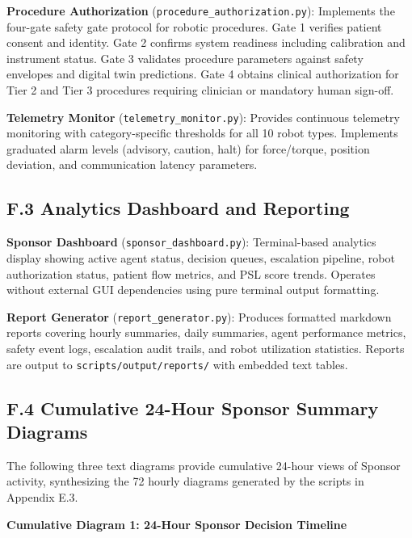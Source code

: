 \textbf{Procedure Authorization} (\texttt{procedure\_authorization.py}):
Implements the four-gate safety gate protocol for robotic procedures.
Gate 1 verifies patient consent and identity. Gate 2 confirms system
readiness including calibration and instrument status. Gate 3 validates
procedure parameters against safety envelopes and digital twin
predictions. Gate 4 obtains clinical authorization for Tier 2 and
Tier 3 procedures requiring clinician or mandatory human sign-off.

\textbf{Telemetry Monitor} (\texttt{telemetry\_monitor.py}):
Provides continuous telemetry monitoring with category-specific
thresholds for all 10 robot types. Implements graduated alarm levels
(advisory, caution, halt) for force/torque, position deviation, and
communication latency parameters.

\subsection*{F.3 Analytics Dashboard and Reporting}

\textbf{Sponsor Dashboard} (\texttt{sponsor\_dashboard.py}): Terminal-based
analytics display showing active agent status, decision queues, escalation
pipeline, robot authorization status, patient flow metrics, and PSL score
trends. Operates without external GUI dependencies using pure terminal
output formatting.

\textbf{Report Generator} (\texttt{report\_generator.py}): Produces
formatted markdown reports covering hourly summaries, daily summaries,
agent performance metrics, safety event logs, escalation audit trails,
and robot utilization statistics. Reports are output to
\texttt{scripts/output/reports/} with embedded text tables.

\subsection*{F.4 Cumulative 24-Hour Sponsor Summary Diagrams}

The following three text diagrams provide cumulative 24-hour views of Sponsor activity,
synthesizing the 72 hourly diagrams generated by the scripts in Appendix E.3.

\textbf{Cumulative Diagram 1: 24-Hour Sponsor Decision Timeline}

